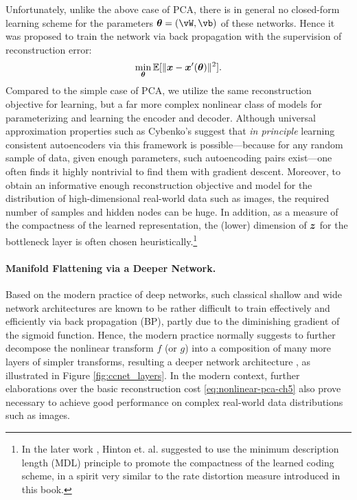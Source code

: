 \documentclass[\toplevelprefix/book-main.tex]{subfiles}
\begin{document}
Unfortunately, unlike the above case of PCA, there is in general no
closed-form learning scheme for the parameters $\boldsymbol{\theta} =
(\vW, \vb)$ of these networks. Hence it was proposed to train the
network via back propagation with the supervision of reconstruction error:
\begin{equation}\label{eq:nonlinear-pca-ch5}
  \min_{\boldsymbol{\theta}} \mathbb{E}[ \|\bm{x} - \bm{x}'(\boldsymbol{\theta})\|^2].
\end{equation}
Compared to the simple case of PCA, we utilize the same reconstruction objective
for learning, but a far more complex nonlinear class of models for
parameterizing and learning the encoder and decoder. Although universal
approximation properties such as Cybenko's suggest that \textit{in principle}
learning consistent autoencoders via this framework is possible---because for
any random sample of data, given enough parameters, such autoencoding pairs
exist---one often finds it highly nontrivial to find them with gradient descent.
Moreover, to obtain an informative enough reconstruction objective
and model for the
distribution of high-dimensional real-world data such as images, the required
number of samples and hidden nodes can be huge.
In addition, as a measure of the compactness of the learned representation, the
(lower) dimension of $\bm{z}$ for the bottleneck layer is often chosen
heuristically.\footnote{In the later work \cite{Hinton-1993}, Hinton et.
  al. suggested to use the minimum description length (MDL) principle to promote
  the compactness of the learned coding scheme, in a spirit very similar to the
rate distortion measure introduced in this book.}

\paragraph{Manifold Flattening via a Deeper Network.}
Based on the modern practice of deep networks, such classical shallow
and wide network architectures are known to be rather difficult to
train effectively and efficiently via back propagation (BP), partly
due to the diminishing gradient of the sigmoid function. Hence, the
modern practice normally suggests to further
decompose the nonlinear transform $f$ (or $g$) into a composition of
many more layers of simpler transforms, resulting a deeper network architecture
\cite{Hinton504}, as illustrated in Figure \ref{fig:ccnet_layers}.
In the modern context, further elaborations over the basic reconstruction cost
\eqref{eq:nonlinear-pca-ch5} also prove necessary to achieve good performance on
complex real-world data distributions such as images.
\end{document}
